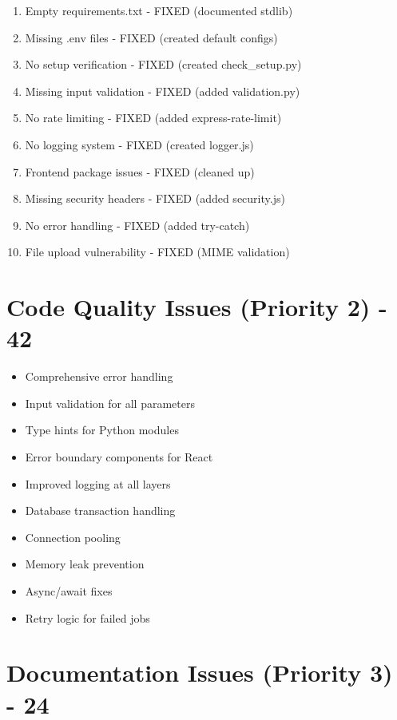 \documentclass[12pt,a4paper]{report}
\begin{document}
\begin{enumerate}
    \item Empty requirements.txt - FIXED (documented stdlib)
    \item Missing .env files - FIXED (created default configs)
    \item No setup verification - FIXED (created check\_setup.py)
    \item Missing input validation - FIXED (added validation.py)
    \item No rate limiting - FIXED (added express-rate-limit)
    \item No logging system - FIXED (created logger.js)
    \item Frontend package issues - FIXED (cleaned up)
    \item Missing security headers - FIXED (added security.js)
    \item No error handling - FIXED (added try-catch)
    \item File upload vulnerability - FIXED (MIME validation)
\end{enumerate}

\section{Code Quality Issues (Priority 2) - 42}

\begin{itemize}
    \item Comprehensive error handling
    \item Input validation for all parameters
    \item Type hints for Python modules
    \item Error boundary components for React
    \item Improved logging at all layers
    \item Database transaction handling
    \item Connection pooling
    \item Memory leak prevention
    \item Async/await fixes
    \item Retry logic for failed jobs
\end{itemize}

\section{Documentation Issues (Priority 3) - 24}
\end{document}
